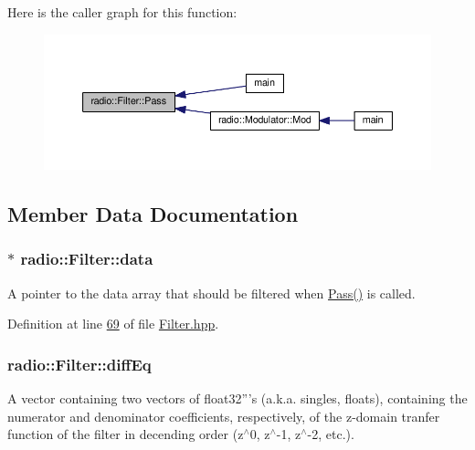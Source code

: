 Here is the caller graph for this function\+:
\nopagebreak
\begin{figure}[H]
\begin{center}
\leavevmode
\includegraphics[width=350pt]{classradio_1_1Filter_ad2793821801780809af385463bf8f197_icgraph}
\end{center}
\end{figure}




\subsection{Member Data Documentation}
\hypertarget{classradio_1_1Filter_a25459a2b762120df0102f00553344be2}{
\subsubsection[{data}]{$\ast$ radio\+::\+Filter\+::data\hspace{0.3cm}{\ttfamily [protected]}}}\label{classradio_1_1Filter_a25459a2b762120df0102f00553344be2}
A pointer to the data array that should be filtered when \hyperlink{classradio_1_1Filter_ad2793821801780809af385463bf8f197}{Pass()} is called. 

Definition at line \hyperlink{Filter_8hpp_source_l00069}{69} of file \hyperlink{Filter_8hpp_source}{Filter.\+hpp}.

\hypertarget{classradio_1_1Filter_abe705768a267844edfa2aaabfdac9f56}{
\subsubsection[{diff\+Eq}]{ radio\+::\+Filter\+::diff\+Eq\hspace{0.3cm}{\ttfamily [protected]}}}\label{classradio_1_1Filter_abe705768a267844edfa2aaabfdac9f56}
A vector containing two vectors of float32'''s (a.\+k.\+a. singles, floats), containing the numerator and denominator coefficients, respectively, of the z-\/domain tranfer function of the filter in decending order (z$^\wedge$0, z$^\wedge$-\/1, z$^\wedge$-\/2, etc.). 

